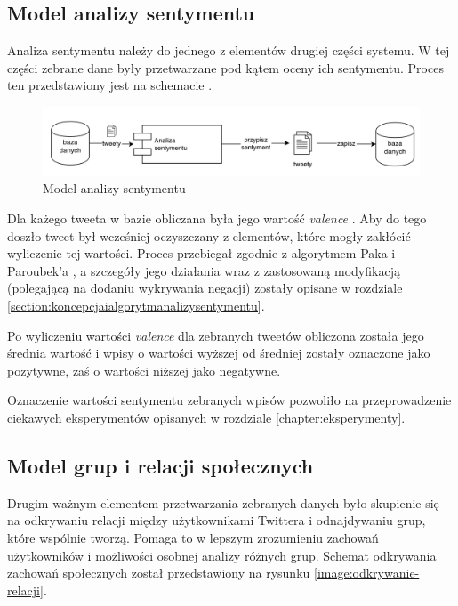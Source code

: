\subsection{Model analizy sentymentu}
\label{subsection:modelanalizysentymentu}

Analiza sentymentu należy do jednego z elementów drugiej części systemu.
W tej części zebrane dane były przetwarzane pod kątem
oceny ich sentymentu. Proces ten przedstawiony jest na schemacie
.

\begin{figure}[ht!]
\centering
\includegraphics[width=160mm]{img/model-analizy-sentymentu.png}
\caption{Model analizy sentymentu}
\label{image:model-analizy-sentymentu}
\end{figure}


Dla każego tweeta w bazie obliczana była jego wartość \textit{valence}
.
Aby do tego doszło tweet był wcześniej oczyszczany z elementów, które mogły
zakłócić wyliczenie tej wartości. Proces przebiegał zgodnie z algorytmem Paka i
Paroubek'a , a szczegóły jego działania wraz
z zastosowaną modyfikacją (polegającą na dodaniu wykrywania
negacji) zostały opisane w rozdziale
\ref{section:koncepcjaialgorytmanalizysentymentu}.

Po wyliczeniu wartości \textit{valence} dla zebranych tweetów obliczona została
jego średnia wartość i wpisy o wartości wyższej od średniej zostały oznaczone
jako pozytywne, zaś o wartości niższej jako negatywne.

Oznaczenie wartości sentymentu zebranych wpisów pozwoliło na przeprowadzenie
ciekawych eksperymentów opisanych w rozdziale \ref{chapter:eksperymenty}.


\subsection{Model grup i relacji społecznych}
\label{subsection:modelgrupirelacjispolecznych}
Drugim ważnym elementem przetwarzania zebranych danych było skupienie się na
odkrywaniu relacji między użytkownikami Twittera i odnajdywaniu grup, które
wspólnie tworzą. Pomaga to w lepszym zrozumieniu zachowań użytkowników i
możliwości osobnej analizy różnych grup. Schemat odkrywania zachowań społecznych
został przedstawiony na rysunku \ref{image:odkrywanie-relacji}.


